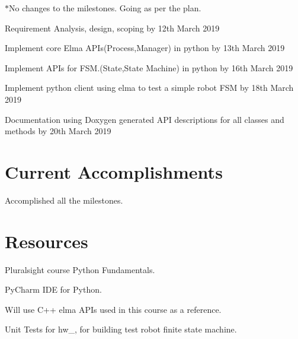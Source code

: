 $\ast$\+No changes to the milestones. Going as per the plan.
\begin{DoxyEnumerate}
\item Requirement Analysis, design, scoping by 12th March 2019
\end{DoxyEnumerate}
\begin{DoxyEnumerate}
\item Implement core Elma A\+P\+Is(\+Process,\+Manager) in python by 13th March 2019
\end{DoxyEnumerate}
\begin{DoxyEnumerate}
\item Implement A\+PI\textquotesingle{}s for F\+SM.(State,State Machine) in python by 16th March 2019
\end{DoxyEnumerate}
\begin{DoxyEnumerate}
\item Implement python client using elma to test a simple robot F\+SM by 18th March 2019
\end{DoxyEnumerate}
\begin{DoxyEnumerate}
\item Documentation using Doxygen generated A\+PI descriptions for all classes and methods by 20th March 2019
\end{DoxyEnumerate}

\section*{Current Accomplishments}


\begin{DoxyEnumerate}
\item Accomplished all the milestones.
\end{DoxyEnumerate}

\section*{Resources}


\begin{DoxyItemize}
\item Pluralsight course Python Fundamentals.
\item Py\+Charm I\+DE for Python.
\item Will use C++ elma A\+PI\textquotesingle{}s used in this course as a reference.
\item Unit Tests for hw\+\_, for building test robot finite state machine.
\end{DoxyItemize}

